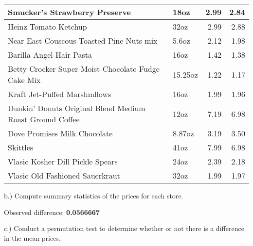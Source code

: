 \documentclass[
  12pt,
]{report}
\newenvironment{Shaded}{\begin{snugshade}}{\end{snugshade}}
\newcommand{\KeywordTok}[1]{\textcolor[rgb]{0.13,0.29,0.53}{\textbf{#1}}}
\newcommand{\NormalTok}[1]{#1}
\newcommand{\OperatorTok}[1]{\textcolor[rgb]{0.81,0.36,0.00}{\textbf{#1}}}
\newcommand{\StringTok}[1]{\textcolor[rgb]{0.31,0.60,0.02}{#1}}
\begin{document}
\begin{table}[!h]
\begin{tabular}[t]{l|l|r|r}
\hline
Smucker's Strawberry Preserve & 18oz & 2.99 & 2.84\\
\hline
Heinz Tomato Ketchup & 32oz & 2.99 & 2.88\\
\hline
Near East Couscous Toasted Pine Nuts mix & 5.6oz & 2.12 & 1.98\\
\hline
Barilla Angel Hair Pasta & 16oz & 1.42 & 1.38\\
\hline
Betty Crocker Super Moist Chocolate Fudge Cake Mix & 15.25oz & 1.22 & 1.17\\
\hline
Kraft Jet-Puffed Marshmllows & 16oz & 1.99 & 1.96\\
\hline
Dunkin' Donuts Original Blend Medium Roast Ground Coffee & 12oz & 7.19 & 6.98\\
\hline
Dove Promises Milk Chocolate & 8.87oz & 3.19 & 3.50\\
\hline
Skittles & 41oz & 7.99 & 6.98\\
\hline
Vlasic Kosher Dill Pickle Spears & 24oz & 2.39 & 2.18\\
\hline
Vlasic Old Fashioned Sauerkraut & 32oz & 1.99 & 1.97\\
\hline
\end{tabular}
\end{table}

b.) Compute summary statistics of the prices for each store.

\begin{Shaded}
\end{Shaded}

Observed difference: \textbf{0.0566667}

c.) Conduct a permutation test to determine whether or not there is a
difference in the mean prices.
\end{document}
